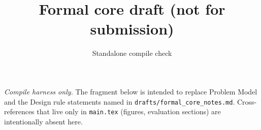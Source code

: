 \documentclass[letterpaper,twocolumn,10pt]{article}
\title{Formal core draft (not for submission)}
\author{Standalone compile check}
\date{}
\theoremstyle{definition}
\theoremstyle{plain}
\begin{document}
\maketitle

\noindent\textit{Compile harness only.} The fragment below is intended to replace
Problem Model and the Design rule statements named in
\texttt{drafts/formal\_core\_notes.md}. Cross-references that live only in
\texttt{main.tex} (figures, evaluation sections) are intentionally absent here.


\end{document}

